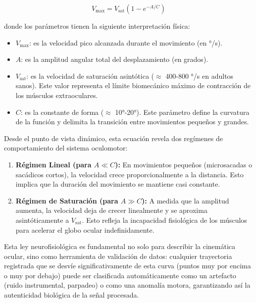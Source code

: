 \begin{equation}
	V_{\text{max}} = V_{\text{sat}} \left(1 - e^{-A/C}\right)
	\label{eq:bahill}
\end{equation}

donde los parámetros tienen la siguiente interpretación física:
\begin{itemize}
	\item $V_{\text{max}}$: es la velocidad pico alcanzada durante el movimiento (en °/s).
	\item $A$: es la amplitud angular total del desplazamiento (en grados).
	\item $V_{\text{sat}}$: es la velocidad de saturación asintótica ($\approx$ 400-800 °/s en adultos sanos). Este valor representa el límite biomecánico máximo de contracción de los músculos extraoculares.
	\item $C$: es la constante de forma ($\approx$ 10°-20°). Este parámetro define la curvatura de la función y delimita la transición entre movimientos pequeños y grandes.
\end{itemize}

Desde el punto de vista dinámico, esta ecuación revela dos regímenes de comportamiento del sistema oculomotor:
\begin{enumerate}
	\item \textbf{Régimen Lineal (para $A \ll C$):} En movimientos pequeños (microsacadas o sacádicos cortos), la velocidad crece proporcionalmente a la distancia. Esto implica que la duración del movimiento se mantiene casi constante.
	\item \textbf{Régimen de Saturación (para $A \gg C$):} A medida que la amplitud aumenta, la velocidad deja de crecer linealmente y se aproxima asintóticamente a $V_{\text{sat}}$. Esto refleja la incapacidad fisiológica de los músculos para acelerar el globo ocular indefinidamente.
\end{enumerate}

Esta ley neurofisiológica es fundamental no solo para describir la cinemática ocular, sino como herramienta de validación de datos: cualquier trayectoria registrada que se desvíe significativamente de esta curva (puntos muy por encima o muy por debajo) puede ser clasificada automáticamente como un artefacto (ruido instrumental, parpadeo) o como una anomalía motora, garantizando así la autenticidad biológica de la señal procesada.

